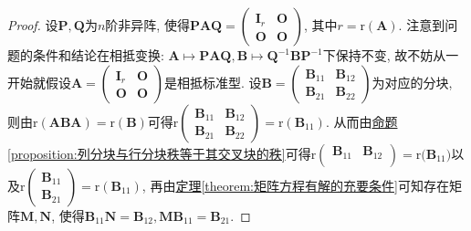 \documentclass[../../main.tex]{subfiles}
\begin{document}
\begin{proof}
设\(\boldsymbol{P},\boldsymbol{Q}\)为\(n\)阶非异阵, 使得\(\boldsymbol{PAQ}=\begin{pmatrix}\boldsymbol{I}_{r}&\boldsymbol{O}\\\boldsymbol{O}&\boldsymbol{O}\end{pmatrix}\), 其中\(r = \mathrm{r}(\boldsymbol{A})\). 注意到问题的条件和结论在相抵变换: \(\boldsymbol{A}\mapsto\boldsymbol{PAQ},\boldsymbol{B}\mapsto\boldsymbol{Q}^{-1}\boldsymbol{BP}^{-1}\)下保持不变, 故不妨从一开始就假设\(\boldsymbol{A}=\begin{pmatrix}\boldsymbol{I}_{r}&\boldsymbol{O}\\\boldsymbol{O}&\boldsymbol{O}\end{pmatrix}\)是相抵标准型. 设\(\boldsymbol{B}=\begin{pmatrix}\boldsymbol{B}_{11}&\boldsymbol{B}_{12}\\\boldsymbol{B}_{21}&\boldsymbol{B}_{22}\end{pmatrix}\)为对应的分块, 则由\(\mathrm{r}(\boldsymbol{ABA})=\mathrm{r}(\boldsymbol{B})\)可得\(\mathrm{r}\begin{pmatrix}\boldsymbol{B}_{11}&\boldsymbol{B}_{12}\\\boldsymbol{B}_{21}&\boldsymbol{B}_{22}\end{pmatrix}=\mathrm{r}(\boldsymbol{B}_{11})\). 从而由\hyperref[proposition:列分块与行分块秩等于其交叉块的秩]{命题\ref{proposition:列分块与行分块秩等于其交叉块的秩}}可得\(\mathrm{r}\left( \begin{matrix}
\boldsymbol{B}_{11}&		\boldsymbol{B}_{12}\\
\end{matrix} \right) =\mathrm{r(}\boldsymbol{B}_{11})\)以及\(\mathrm{r}\begin{pmatrix}\boldsymbol{B}_{11}\\\boldsymbol{B}_{21}\end{pmatrix}=\mathrm{r}(\boldsymbol{B}_{11})\), 再由\hyperref[theorem:矩阵方程有解的充要条件]{定理\ref{theorem:矩阵方程有解的充要条件}}可知存在矩阵\(\boldsymbol{M},\boldsymbol{N}\), 使得\(\boldsymbol{B}_{11}\boldsymbol{N}=\boldsymbol{B}_{12},\boldsymbol{M}\boldsymbol{B}_{11}=\boldsymbol{B}_{21}\). 


\end{proof}
\end{document}
